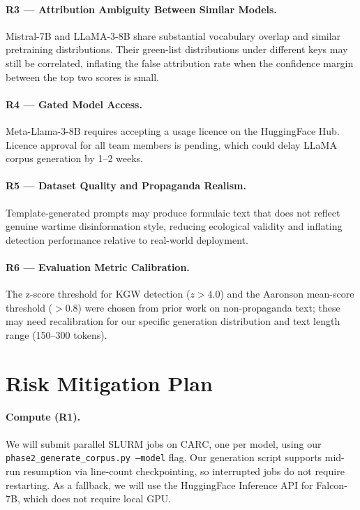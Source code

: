 \documentclass[11pt]{article}
\begin{document}
\paragraph{R3 — Attribution Ambiguity Between Similar Models.}
Mistral-7B and LLaMA-3-8B share substantial vocabulary overlap and similar
pretraining distributions.  Their green-list distributions under different keys
may still be correlated, inflating the false attribution rate when the
confidence margin between the top two scores is small.

\paragraph{R4 — Gated Model Access.}
Meta-Llama-3-8B requires accepting a usage licence on the HuggingFace Hub.
Licence approval for all team members is pending, which could delay LLaMA corpus
generation by 1--2 weeks.

\paragraph{R5 — Dataset Quality and Propaganda Realism.}
Template-generated prompts may produce formulaic text that does not reflect
genuine wartime disinformation style, reducing ecological validity and inflating
detection performance relative to real-world deployment.

\paragraph{R6 — Evaluation Metric Calibration.}
The z-score threshold for KGW detection ($z > 4.0$) and the Aaronson mean-score
threshold ($> 0.8$) were chosen from prior work on non-propaganda text; these
may need recalibration for our specific generation distribution and text length
range (150--300 tokens).

\section{Risk Mitigation Plan}

\paragraph{Compute (R1).}
We will submit parallel SLURM jobs on CARC, one per model, using our
\texttt{phase2\_generate\_corpus.py --model} flag.  Our generation script
supports mid-run resumption via line-count checkpointing, so interrupted jobs
do not require restarting.  As a fallback, we will use the HuggingFace
Inference API for Falcon-7B, which does not require local GPU.
\end{document}
